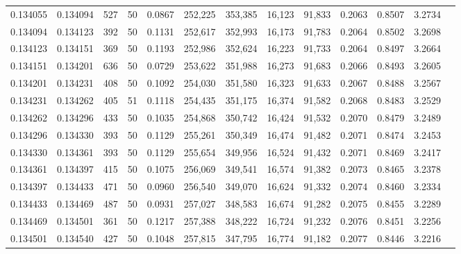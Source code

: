 \begin{tabular}{rrrrrrrrrrrrr}
0.134055 & 0.134094 &   527 &  50 &                                     0.0867 & 252,225 & 353,385 &  16,123 &  91,833 & 0.2063 & 0.8507 & 3.2734 \\
0.134094 & 0.134123 &   392 &  50 &                                     0.1131 & 252,617 & 352,993 &  16,173 &  91,783 & 0.2064 & 0.8502 & 3.2698 \\
0.134123 & 0.134151 &   369 &  50 &                                     0.1193 & 252,986 & 352,624 &  16,223 &  91,733 & 0.2064 & 0.8497 & 3.2664 \\
0.134151 & 0.134201 &   636 &  50 &                                     0.0729 & 253,622 & 351,988 &  16,273 &  91,683 & 0.2066 & 0.8493 & 3.2605 \\
0.134201 & 0.134231 &   408 &  50 &                                     0.1092 & 254,030 & 351,580 &  16,323 &  91,633 & 0.2067 & 0.8488 & 3.2567 \\
0.134231 & 0.134262 &   405 &  51 &                                     0.1118 & 254,435 & 351,175 &  16,374 &  91,582 & 0.2068 & 0.8483 & 3.2529 \\
0.134262 & 0.134296 &   433 &  50 &                                     0.1035 & 254,868 & 350,742 &  16,424 &  91,532 & 0.2070 & 0.8479 & 3.2489 \\
0.134296 & 0.134330 &   393 &  50 &                                     0.1129 & 255,261 & 350,349 &  16,474 &  91,482 & 0.2071 & 0.8474 & 3.2453 \\
0.134330 & 0.134361 &   393 &  50 &                                     0.1129 & 255,654 & 349,956 &  16,524 &  91,432 & 0.2071 & 0.8469 & 3.2417 \\
0.134361 & 0.134397 &   415 &  50 &                                     0.1075 & 256,069 & 349,541 &  16,574 &  91,382 & 0.2073 & 0.8465 & 3.2378 \\
0.134397 & 0.134433 &   471 &  50 &                                     0.0960 & 256,540 & 349,070 &  16,624 &  91,332 & 0.2074 & 0.8460 & 3.2334 \\
0.134433 & 0.134469 &   487 &  50 &                                     0.0931 & 257,027 & 348,583 &  16,674 &  91,282 & 0.2075 & 0.8455 & 3.2289 \\
0.134469 & 0.134501 &   361 &  50 &                                     0.1217 & 257,388 & 348,222 &  16,724 &  91,232 & 0.2076 & 0.8451 & 3.2256 \\
0.134501 & 0.134540 &   427 &  50 &                                     0.1048 & 257,815 & 347,795 &  16,774 &  91,182 & 0.2077 & 0.8446 & 3.2216 \\

\end{tabular}
